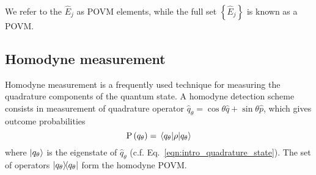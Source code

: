 \noindent We refer to the $\hat{E}_j$ as POVM elements, while the full set $\left\{\hat{E}_j\right\}$ is known as a POVM.



\FloatBarrier
\subsection{Homodyne measurement}\label{sec:intro_homodyne}
Homodyne measurement is a frequently used technique for measuring the quadrature components of the quantum state. A homodyne detection scheme consists in measurement of quadrature operator $\hat{q}_\theta = \cos\theta \hat{q} + \sin\theta \hat{p}$, which gives outcome probabilities
\begin{equation}
\text{P}\left(q_\theta\right) = \ev{\rho}{q_\theta}
\end{equation}
where $\ket{q_\theta}$ is the eigenstate of $\hat{q}_\theta$ (c.f. Eq.~\ref{eqn:intro_quadrature_state}).%
The set of operators $\dyad{q_\theta}$ form the homodyne POVM.


